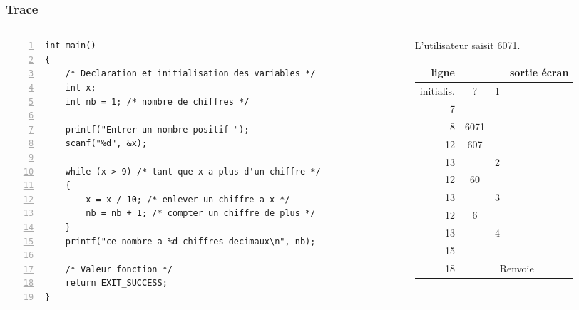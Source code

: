 \documentclass[xcolor=pdftex,svgnames,table]{beamer}
\begin{document}
\begin{frame}[fragile]
  \frametitle{Trace}
\begin{columns}
  \begin{column}[t]{3.7cm}
 \begin{lstlisting}[numbers=left,basicstyle=\ttfamily\scriptsize]
int main()
{
    /* Declaration et initialisation des variables */
    int x;
    int nb = 1; /* nombre de chiffres */

    printf("Entrer un nombre positif ");
    scanf("%d", &x);
    
    while (x > 9) /* tant que x a plus d'un chiffre */
    {
        x = x / 10; /* enlever un chiffre a x */
        nb = nb + 1; /* compter un chiffre de plus */
    }
    printf("ce nombre a %d chiffres decimaux\n", nb);
    
    /* Valeur fonction */
    return EXIT_SUCCESS;
}
\end{lstlisting}
\vspace{.4cm}
  \end{column}
\begin{column}[t]{4cm}
\scriptsize
\pause
L'utilisateur saisit 6071.

\begin{tabular}{|r|c|c|l|}
\hline
    ligne & \C{x} & \C{nb} & sortie écran \pause \\ \hline
  initialis.& ? &  1 & \pause \\
7 &  &  & \C{Entrer\ldots}\pause \\
8 &  6071 &  & \pause\\
12 &  607 &  & \pause \\
13 &   & 2 & \pause\\
12 &  60 &  & \pause\\
13 &   & 3 & \pause \\
12 &  6 &  & \pause\\
13 &   & 4 &  \pause \\
15 & & & \C{ce nombre a 4...}\pause \\ 
18 & \multicolumn{3}{c}{Renvoie \C{EXIT\_SUCCESS}}
\end{tabular}
 \end{column}
\end{columns}
\end{frame}
\end{document}
